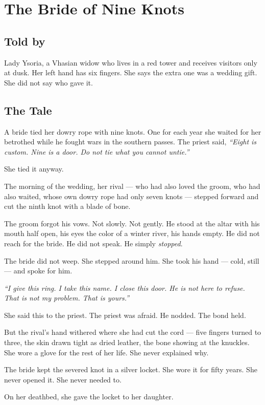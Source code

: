 \chapter{The Bride of Nine Knots}

\section*{Told by}
Lady Ysoria, a Vhasian widow who lives in a red tower and receives visitors only at dusk. Her left hand has six fingers. She says the extra one was a wedding gift. She did not say who gave it.

\section*{The Tale}

A bride tied her dowry rope with nine knots. One for each year she waited for her betrothed while he fought wars in the southern passes. The priest said, \textit{``Eight is custom. Nine is a door. Do not tie what you cannot untie.''}

She tied it anyway.

The morning of the wedding, her rival --- who had also loved the groom, who had also waited, whose own dowry rope had only seven knots --- stepped forward and cut the ninth knot with a blade of bone.

The groom forgot his vows. Not slowly. Not gently. He stood at the altar with his mouth half open, his eyes the color of a winter river, his hands empty. He did not reach for the bride. He did not speak. He simply \textit{stopped}.

The bride did not weep. She stepped around him. She took his hand --- cold, still --- and spoke for him.

\textit{``I give this ring. I take this name. I close this door. He is not here to refuse. That is not my problem. That is yours.''}

She said this to the priest. The priest was afraid. He nodded. The bond held.

But the rival's hand withered where she had cut the cord --- five fingers turned to three, the skin drawn tight as dried leather, the bone showing at the knuckles. She wore a glove for the rest of her life. She never explained why.

The bride kept the severed knot in a silver locket. She wore it for fifty years. She never opened it. She never needed to.

On her deathbed, she gave the locket to her daughter.

